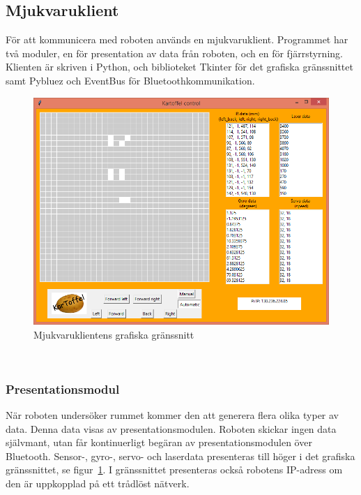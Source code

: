 \documentclass{article}
\begin{document}
\subsection{Mjukvaruklient}
För att kommunicera med roboten används en mjukvaruklient. Programmet har två moduler, en för presentation av data från roboten, och en för fjärrstyrning. Klienten är skriven i Python, och biblioteket Tkinter för det grafiska gränssnittet samt Pybluez och EventBus för Bluetoothkommunikation. 

\begin{figure}[H]
\centering
\includegraphics[scale=0.55]{client_interface}
\caption{Mjukvaruklientens grafiska gränssnitt}
\label{fig:client_interface}
\end{figure}
\ \\
\subsubsection{Presentationsmodul}
När roboten undersöker rummet kommer den att generera flera olika typer av data. Denna data visas av presentationsmodulen. Roboten skickar ingen data självmant, utan får kontinuerligt begäran av presentationsmodulen över Bluetooth. Sensor-, gyro-, servo- och laserdata presenteras till höger i det grafiska gränssnittet, se figur~\ref{fig:client_interface}. I gränssnittet presenteras också robotens IP-adress om den är uppkopplad på ett trådlöst nätverk.
\end{document}
